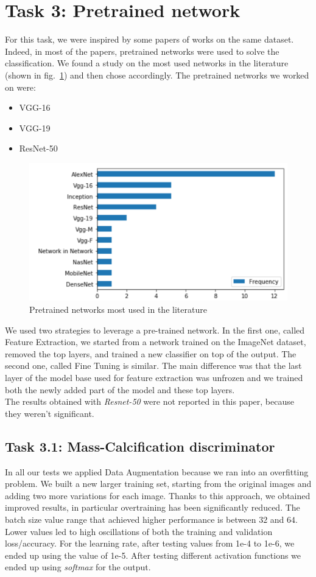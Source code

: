 \documentclass[11pt,a4paper,oneside]{article}
\begin{document}
\clearpage

\section{Task 3: Pretrained network}
For this task, we were inspired by some papers of works on the same dataset. Indeed, in most of the papers, pretrained networks were used to solve the classification. 
We found a study on the most used networks in the literature (shown in fig.~\ref{fig:pretrained_networks}) and then chose accordingly. The pretrained networks we worked on were:
\begin{itemize}
\item VGG-16
\item VGG-19
\item ResNet-50
\end{itemize}

\begin{figure}[h]
\centering
\includegraphics[width=.5\textwidth]{images/pretrained_networks}
\caption{Pretrained networks most used in the literature}
\label{fig:pretrained_networks}
\end{figure}

We used two strategies to leverage a pre-trained network. In the first one, called Feature Extraction, we started from a network trained on the ImageNet dataset, removed the top layers, and trained a new classifier on top of the output.
The second one, called Fine Tuning is similar. The main difference was that the last layer of the model base used for feature extraction was unfrozen and we trained both the newly added part of the model and these top layers. \\
The results obtained with \textit{Resnet-50} were not reported in this paper, because they weren't significant.

\subsection{Task 3.1: Mass-Calcification discriminator}
In all our tests we applied Data Augmentation because we ran into an overfitting problem.
We built a new larger training set, starting from the original images and adding two more variations for each image. Thanks to this approach, we obtained improved results, in particular overtraining has been significantly reduced. The batch size value range that achieved higher performance is between $32$ and $64$. Lower values led to high oscillations of both the training and validation loss/accuracy. For the learning rate, after testing values from 1e-4 to 1e-6, we ended up using the value of 1e-5. After testing different activation functions we ended up using \textit{softmax} for the output. 
\end{document}
